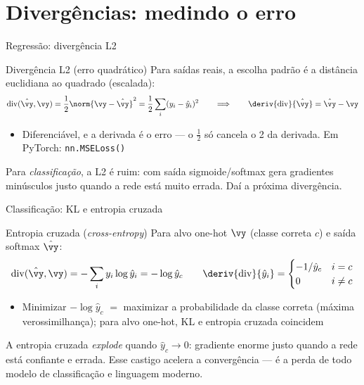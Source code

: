 \documentclass[aspectratio=169, 11pt]{beamer}
\begin{document}
\section{Divergências: medindo o erro}

\begin{frame}{Regressão: divergência L2}
  \begin{defbox}{Divergência L2 (erro quadrático)}
    Para saídas reais, a escolha padrão é a distância euclidiana ao quadrado
    (escalada):
    \[
      \mathrm{div}(\hat{\vy}, \vy) = \frac{1}{2} \norm{\vy - \hat{\vy}}^2
             = \frac{1}{2} \sum_i (y_i - \hat{y}_i)^2
      \qquad\Longrightarrow\qquad
      \deriv{\mathrm{div}}{\hat{\vy}} = \hat{\vy} - \vy
    \]
  \end{defbox}

  \begin{itemize}\setlength{\itemsep}{0.2ex}
    \item Diferenciável, e a derivada é o \alert{erro} — o $\tfrac{1}{2}$ só
          cancela o 2 da derivada. Em PyTorch: \texttt{nn.MSELoss()}
  \end{itemize}

  \begin{alertabox}
    Para \emph{classificação}, a L2 é ruim: com saída sigmoide/softmax gera
    gradientes minúsculos justo quando a rede está muito errada. Daí a próxima
    divergência.
  \end{alertabox}
\end{frame}

\begin{frame}{Classificação: KL e entropia cruzada}
  \begin{defbox}{Entropia cruzada (\emph{cross-entropy})}
    Para alvo one-hot $\vy$ (classe correta $c$) e saída softmax $\hat{\vy}$:
    \[
      \mathrm{div}(\hat{\vy}, \vy)
        = -\sum_i y_i \log \hat{y}_i
        = -\log \hat{y}_c
      \qquad
      \deriv{\mathrm{div}}{\hat{y}_i} =
        \begin{cases} -1/\hat{y}_c & i = c \\ 0 & i \neq c \end{cases}
    \]
  \end{defbox}

  \begin{itemize}\setlength{\itemsep}{0.2ex}
    \item Minimizar $-\log \hat{y}_c$ $=$ maximizar a probabilidade da classe
          correta (máxima verossimilhança); para alvo one-hot, KL e entropia
          cruzada \alert{coincidem}
  \end{itemize}

  \begin{ideiabox}
    A entropia cruzada \emph{explode} quando $\hat{y}_c \to 0$: gradiente enorme
    justo quando a rede está confiante e errada. Esse castigo acelera a
    convergência — é a perda de todo modelo de classificação e linguagem moderno.
  \end{ideiabox}
\end{frame}
\end{document}
